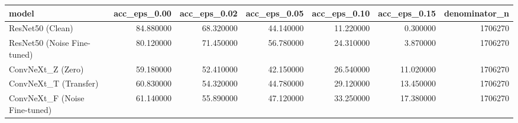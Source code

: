 \begin{tabular}{lrrrrrr}
\toprule
model & acc_eps_0.00 & acc_eps_0.02 & acc_eps_0.05 & acc_eps_0.10 & acc_eps_0.15 & denominator_n \\
\midrule
ResNet50 (Clean) & 84.880000 & 68.320000 & 44.140000 & 11.220000 & 0.300000 & 1706270 \\
ResNet50 (Noise Fine-tuned) & 80.120000 & 71.450000 & 56.780000 & 24.310000 & 3.870000 & 1706270 \\
ConvNeXt_Z (Zero) & 59.180000 & 52.410000 & 42.150000 & 26.540000 & 11.020000 & 1706270 \\
ConvNeXt_T (Transfer) & 60.830000 & 54.320000 & 44.780000 & 29.120000 & 13.450000 & 1706270 \\
ConvNeXt_F (Noise Fine-tuned) & 61.140000 & 55.890000 & 47.120000 & 33.250000 & 17.380000 & 1706270 \\
\bottomrule
\end{tabular}
